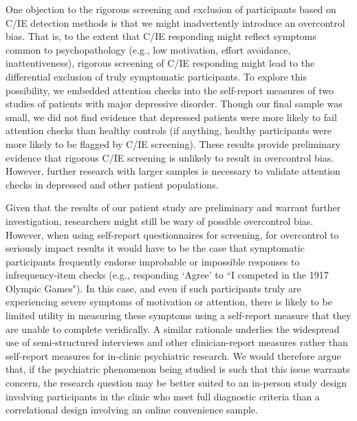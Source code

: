 \documentclass[a4paper,notitlepage,12pt]{article}
\begin{document}
One objection to the rigorous screening and exclusion of participants based on C/IE detection methods is that we might inadvertently introduce an overcontrol bias. That is, to the extent that C/IE responding might reflect symptoms common to psychopathology (e.g., low motivation, effort avoidance, inattentiveness), rigorous screening of C/IE responding might lead to the differential exclusion of truly symptomatic participants. To explore this possibility, we embedded attention checks into the self-report measures of two studies of patients with major depressive disorder. Though our final sample was small, we did not find evidence that depressed patients were more likely to fail attention checks than healthy controls (if anything, healthy participants were more likely to be flagged by C/IE screening). These results provide preliminary evidence that rigorous C/IE screening is unlikely to result in overcontrol bias. However, further research with larger samples is necessary to validate attention checks in depressed and other patient populations. 

Given that the results of our patient study are preliminary and warrant further investigation, researchers might still be wary of possible overcontrol bias. However, when using self-report questionnaires for screening, for overcontrol to seriously impact results it would have to be the case that symptomatic participants frequently endorse improbable or impossible responses to infrequency-item checks (e.g., responding `Agree' to ``I competed in the 1917 Olympic Games"). In this case, and even if such participants truly are experiencing severe symptoms of motivation or attention, there is likely to be limited utility in measuring these symptoms using a self-report measure that they are unable to complete veridically. A similar rationale underlies the widespread use of semi-structured interviews and other clinician-report measures rather than self-report measures for in-clinic psychiatric research. We would therefore argue that, if the psychiatric phenomenon being studied is such that this issue warrants concern, the research question may be better suited to an in-person study design involving participants in the clinic who meet full diagnostic criteria than a correlational design involving an online convenience sample.
\end{document}
